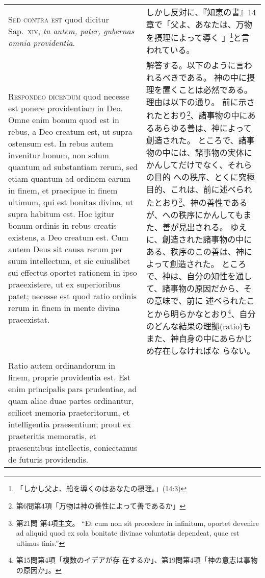 \documentclass[10pt]{jsarticle} %
\begin{document}
\begin{longtable}{p{21em}p{21em}}
\\


{\scshape Sed contra est} quod dicitur Sap.~{\scshape xiv}, {\itshape tu
autem, pater, gubernas omnia providentia}.


&

しかし反対に、『知恵の書』14章で「父よ、あなたは、万物を摂理によって導く
 」\footnote{「しかし父よ、船を導くのはあなたの摂理。」(14:3)}と言われている。


\\


{\scshape Respondeo dicendum} quod necesse est ponere
providentiam in Deo. Omne enim bonum quod est in rebus, a Deo creatum
est, ut supra ostensum est. In rebus autem invenitur bonum, non solum
quantum ad substantiam rerum, sed etiam quantum ad ordinem earum in
finem, et praecipue in finem ultimum, qui est bonitas divina, ut supra
habitum est. Hoc igitur bonum ordinis in rebus creatis existens, a Deo
creatum est. Cum autem Deus sit causa rerum per suum intellectum, et sic
cuiuslibet sui effectus oportet rationem in ipso praeexistere, ut ex
superioribus patet; necesse est quod ratio ordinis rerum in finem in
mente divina praeexistat. 

&

解答する。以下のように言われるべきである。
神の中に摂理を置くことは必然である。理由は以下の通り。
前に示されたとおり\footnote{第6問第4項「万物は神の善性によって善であるか」}、諸事物の中にあるあらゆる善は、神によって創造された。
ところで、諸事物の中には、諸事物の実体にかんしてだけでなく、それらの目的
 への秩序、とくに究極目的、これは、前に述べられたとおり\footnote{第21問
 第4項主文。 ``Et cum non sit procedere in infinitum, oportet devenire ad aliquid quod ex sola bonitate divinae voluntatis dependeat, quae est ultimus finis.''}、神の善性である
 が、への秩序にかんしてもまた、善が見出される。
ゆえに、創造された諸事物の中にある、秩序のこの善は、神によって創造された。
ところで、神は、自分の知性を通して、諸事物の原因だから、その意味で、前に
 述べられたことから明らかなとおり\footnote{第15問第4項「複数のイデアが存
 在するか」、第19問第4項「神の意志は事物の原因か」。}、自分
 のどんな結果の理拠(ratio)もまた、神自身の中にあらかじめ存在しなければな
 らない。



\\


Ratio autem ordinandorum in finem, proprie
providentia est. Est enim principalis pars prudentiae, ad quam aliae
duae partes ordinantur, scilicet memoria praeteritorum, et intelligentia
praesentium; prout ex praeteritis memoratis, et praesentibus
intellectis, coniectamus de futuris providendis. 


\end{longtable}
\end{document}
